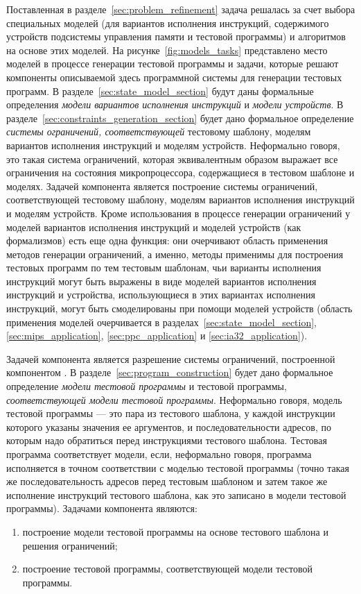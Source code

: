 Поставленная в разделе~\ref{sec:problem_refinement} задача решалась за счет выбора специальных моделей (для вариантов исполнения инструкций, содержимого устройств подсистемы управления памяти и тестовой программы) и алгоритмов на основе этих моделей. На рисунке~\ref{fig:models_tasks} представлено место моделей в процессе генерации тестовой программы и задачи, которые решают компоненты описываемой здесь программной системы для генерации тестовых программ. В разделе~\ref{sec:state_model_section} будут даны формальные определения \emph{модели вариантов исполнения инструкций} и \emph{модели устройств}. В разделе~\ref{sec:constraints_generation_section} будет дано формальное определение \emph{системы ограничений, соответствующей} тестовому шаблону, моделям вариантов исполнения инструкций и моделям устройств. Неформально говоря, это такая система ограничений, которая эквивалентным образом выражает все ограничения на состояния микропроцессора, содержащиеся в тестовом шаблоне и моделях. Задачей компонента  является построение системы ограничений, соответствующей тестовому шаблону, моделям вариантов исполнения инструкций и моделям устройств. Кроме использования в процессе генерации ограничений у моделей вариантов исполнения инструкций и моделей устройств (как формализмов) есть еще одна функция: они очерчивают область применения методов генерации ограничений, а именно, методы применимы для построения тестовых программ по тем тестовым шаблонам, чьи варианты исполнения инструкций могут быть выражены в виде моделей вариантов исполнения инструкций и устройства, использующиеся в этих вариантах исполнения инструкций, могут быть смоделированы при помощи моделей устройств (область применения моделей очерчивается в разделах~\ref{sec:state_model_section}, \ref{sec:mips_application}, \ref{sec:ppc_application} и \ref{sec:ia32_application}).

Задачей компонента  является разрешение системы ограничений, построенной компонентом . В разделе~\ref{sec:program_construction} будет дано формальное определение \emph{модели тестовой программы} и тестовой программы, \emph{соответствующей модели тестовой программы}. Неформально говоря, модель тестовой программы --- это пара из тестового шаблона, у каждой инструкции которого указаны значения ее аргументов, и последовательности адресов, по которым надо обратиться перед инструкциями тестового шаблона. Тестовая программа соответствует модели, если, неформально говоря, программа исполняется в точном соответствии с моделью тестовой программы (точно такая же последовательность адресов перед тестовым шаблоном и затем такое же исполнение инструкций тестового шаблона, как это записано в модели тестовой программы). Задачами компонента  являются:
\begin{enumerate}
  \item построение модели тестовой программы на основе тестового шаблона и решения ограничений;
  \item построение тестовой программы, соответствующей модели тестовой программы.
\end{enumerate}



